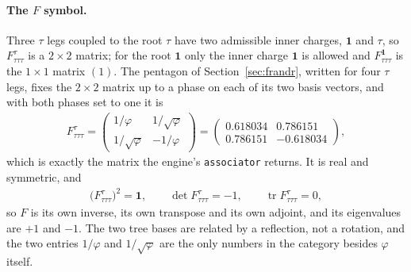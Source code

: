\paragraph{The $F$ symbol.} Three $\tau$ legs coupled to the root $\tau$ have two
admissible inner charges, $\mathbf 1$ and $\tau$, so $F^{\tau}_{\tau\tau\tau}$ is a
$2\times2$ matrix; for the root $\mathbf 1$ only the inner charge $\mathbf 1$ is allowed
and $F^{\mathbf 1}_{\tau\tau\tau}$ is the $1\times1$ matrix $(1)$. The pentagon of
Section~\ref{sec:frandr}, written for four $\tau$ legs, fixes the $2\times2$ matrix up to
a phase on each of its two basis vectors, and with both phases set to one it is
\begin{align}
F^{\tau}_{\tau\tau\tau}
=\begin{pmatrix}
1/\varphi & 1/\sqrt{\varphi}\\
1/\sqrt{\varphi} & -1/\varphi
\end{pmatrix}
=\begin{pmatrix}
0.618034 & 0.786151\\
0.786151 & -0.618034
\end{pmatrix},
\end{align}
which is exactly the matrix the engine's \texttt{associator} returns. It is real and
symmetric, and
\begin{align}
\bigl(F^{\tau}_{\tau\tau\tau}\bigr)^2=\mathbf 1,\qquad
\det F^{\tau}_{\tau\tau\tau}=-1,\qquad
\operatorname{tr}F^{\tau}_{\tau\tau\tau}=0 ,
\end{align}
so $F$ is its own inverse, its own transpose and its own adjoint, and its eigenvalues
are $+1$ and $-1$. The two tree bases are related by a reflection, not a rotation, and
the two entries $1/\varphi$ and $1/\sqrt{\varphi}$ are the only numbers in the category
besides $\varphi$ itself.

